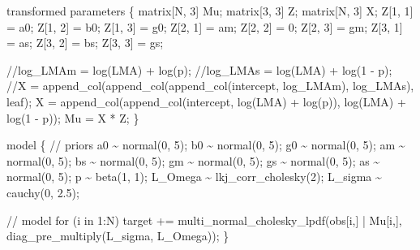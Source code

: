 \documentclass[
  12pt,
  letterpaper,
  DIV=11,
  numbers=noendperiod]{scrartcl}
\newenvironment{Shaded}{\begin{snugshade}}{\end{snugshade}}
\newcommand{\CommentTok}[1]{\textcolor[rgb]{0.37,0.37,0.37}{#1}}
\newcommand{\ControlFlowTok}[1]{\textcolor[rgb]{0.00,0.23,0.31}{#1}}
\newcommand{\DataTypeTok}[1]{\textcolor[rgb]{0.68,0.00,0.00}{#1}}
\newcommand{\DecValTok}[1]{\textcolor[rgb]{0.68,0.00,0.00}{#1}}
\newcommand{\FloatTok}[1]{\textcolor[rgb]{0.68,0.00,0.00}{#1}}
\newcommand{\KeywordTok}[1]{\textcolor[rgb]{0.00,0.23,0.31}{#1}}
\newcommand{\NormalTok}[1]{\textcolor[rgb]{0.00,0.23,0.31}{#1}}
\begin{document}
\begin{Shaded}
\begin{Highlighting}[]
\KeywordTok{transformed parameters}\NormalTok{ \{}
  \DataTypeTok{matrix}\NormalTok{[N, }\DecValTok{3}\NormalTok{] Mu;}
  \DataTypeTok{matrix}\NormalTok{[}\DecValTok{3}\NormalTok{, }\DecValTok{3}\NormalTok{] Z;}
  \DataTypeTok{matrix}\NormalTok{[N, }\DecValTok{3}\NormalTok{] X;}
\NormalTok{  Z[}\DecValTok{1}\NormalTok{, }\DecValTok{1}\NormalTok{] = a0;}
\NormalTok{  Z[}\DecValTok{1}\NormalTok{, }\DecValTok{2}\NormalTok{] = b0;}
\NormalTok{  Z[}\DecValTok{1}\NormalTok{, }\DecValTok{3}\NormalTok{] = g0;}
\NormalTok{  Z[}\DecValTok{2}\NormalTok{, }\DecValTok{1}\NormalTok{] = am;}
\NormalTok{  Z[}\DecValTok{2}\NormalTok{, }\DecValTok{2}\NormalTok{] = }\DecValTok{0}\NormalTok{;}
\NormalTok{  Z[}\DecValTok{2}\NormalTok{, }\DecValTok{3}\NormalTok{] = gm;}
\NormalTok{  Z[}\DecValTok{3}\NormalTok{, }\DecValTok{1}\NormalTok{] = as;}
\NormalTok{  Z[}\DecValTok{3}\NormalTok{, }\DecValTok{2}\NormalTok{] = bs;}
\NormalTok{  Z[}\DecValTok{3}\NormalTok{, }\DecValTok{3}\NormalTok{] = gs;}

  \CommentTok{//log\_LMAm = log(LMA) + log(p);}
  \CommentTok{//log\_LMAs = log(LMA) + log(1 {-} p);}
  \CommentTok{//X = append\_col(append\_col(append\_col(intercept, log\_LMAm), log\_LMAs), leaf);}
\NormalTok{  X = append\_col(append\_col(intercept, log(LMA) + log(p)), log(LMA) + log(}\DecValTok{1}\NormalTok{ {-} p));}
\NormalTok{  Mu = X * Z;}
\NormalTok{\}}

\KeywordTok{model}\NormalTok{ \{}
  \CommentTok{// priors}
\NormalTok{  a0 \textasciitilde{} normal(}\DecValTok{0}\NormalTok{, }\DecValTok{5}\NormalTok{);}
\NormalTok{  b0 \textasciitilde{} normal(}\DecValTok{0}\NormalTok{, }\DecValTok{5}\NormalTok{);}
\NormalTok{  g0 \textasciitilde{} normal(}\DecValTok{0}\NormalTok{, }\DecValTok{5}\NormalTok{);}
\NormalTok{  am \textasciitilde{} normal(}\DecValTok{0}\NormalTok{, }\DecValTok{5}\NormalTok{);}
\NormalTok{  bs \textasciitilde{} normal(}\DecValTok{0}\NormalTok{, }\DecValTok{5}\NormalTok{);}
\NormalTok{  gm \textasciitilde{} normal(}\DecValTok{0}\NormalTok{, }\DecValTok{5}\NormalTok{);}
\NormalTok{  gs \textasciitilde{} normal(}\DecValTok{0}\NormalTok{, }\DecValTok{5}\NormalTok{);}
\NormalTok{  as \textasciitilde{} normal(}\DecValTok{0}\NormalTok{, }\DecValTok{5}\NormalTok{);}
\NormalTok{  p \textasciitilde{} beta(}\DecValTok{1}\NormalTok{, }\DecValTok{1}\NormalTok{);}
\NormalTok{  L\_Omega \textasciitilde{} lkj\_corr\_cholesky(}\DecValTok{2}\NormalTok{);}
\NormalTok{  L\_sigma \textasciitilde{} cauchy(}\DecValTok{0}\NormalTok{, }\FloatTok{2.5}\NormalTok{);}

  \CommentTok{// model}
  \ControlFlowTok{for}\NormalTok{ (i }\ControlFlowTok{in} \DecValTok{1}\NormalTok{:N)}
     \KeywordTok{target +=}\NormalTok{ multi\_normal\_cholesky\_lpdf(obs[i,] | Mu[i,], diag\_pre\_multiply(L\_sigma, L\_Omega));}
\NormalTok{\}}


\end{Highlighting}
\end{Shaded}
\end{document}
